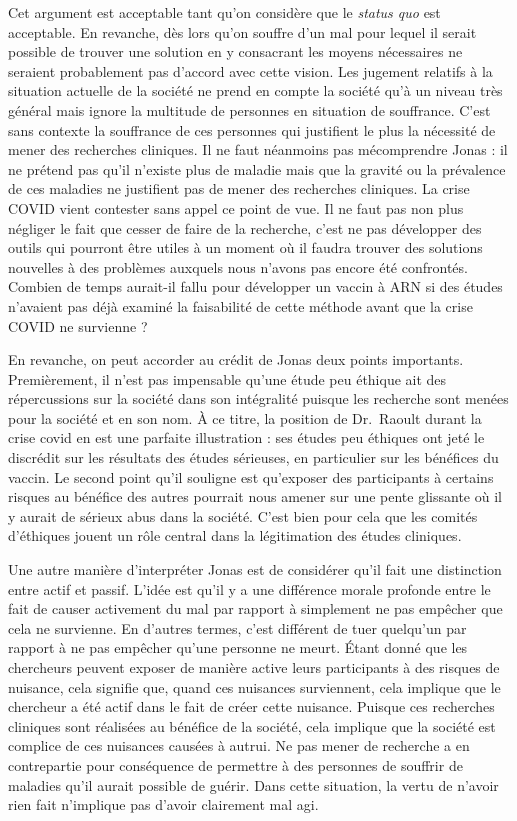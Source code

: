 \documentclass[
  12pt,
]{book}
\begin{document}
Cet argument est acceptable tant qu'on considère que le \emph{status quo} est acceptable. En revanche, dès lors qu'on souffre d'un mal pour lequel il serait possible de trouver une solution en y consacrant les moyens nécessaires ne seraient probablement pas d'accord avec cette vision. Les jugement relatifs à la situation actuelle de la société ne prend en compte la société qu'à un niveau très général mais ignore la multitude de personnes en situation de souffrance. C'est sans contexte la souffrance de ces personnes qui justifient le plus la nécessité de mener des recherches cliniques. Il ne faut néanmoins pas mécomprendre Jonas : il ne prétend pas qu'il n'existe plus de maladie mais que la gravité ou la prévalence de ces maladies ne justifient pas de mener des recherches cliniques. La crise COVID vient contester sans appel ce point de vue. Il ne faut pas non plus négliger le fait que cesser de faire de la recherche, c'est ne pas développer des outils qui pourront être utiles à un moment où il faudra trouver des solutions nouvelles à des problèmes auxquels nous n'avons pas encore été confrontés. Combien de temps aurait-il fallu pour développer un vaccin à ARN si des études n'avaient pas déjà examiné la faisabilité de cette méthode avant que la crise COVID ne survienne ?

En revanche, on peut accorder au crédit de Jonas deux points importants. Premièrement, il n'est pas impensable qu'une étude peu éthique ait des répercussions sur la société dans son intégralité puisque les recherche sont menées pour la société et en son nom. À ce titre, la position de Dr.~Raoult durant la crise covid en est une parfaite illustration : ses études peu éthiques ont jeté le discrédit sur les résultats des études sérieuses, en particulier sur les bénéfices du vaccin. Le second point qu'il souligne est qu'exposer des participants à certains risques au bénéfice des autres pourrait nous amener sur une pente glissante où il y aurait de sérieux abus dans la société. C'est bien pour cela que les comités d'éthiques jouent un rôle central dans la légitimation des études cliniques.

Une autre manière d'interpréter Jonas est de considérer qu'il fait une distinction entre actif et passif. L'idée est qu'il y a une différence morale profonde entre le fait de causer activement du mal par rapport à simplement ne pas empêcher que cela ne survienne. En d'autres termes, c'est différent de tuer quelqu'un par rapport à ne pas empêcher qu'une personne ne meurt. Étant donné que les chercheurs peuvent exposer de manière active leurs participants à des risques de nuisance, cela signifie que, quand ces nuisances surviennent, cela implique que le chercheur a été actif dans le fait de créer cette nuisance. Puisque ces recherches cliniques sont réalisées au bénéfice de la société, cela implique que la société est complice de ces nuisances causées à autrui. Ne pas mener de recherche a en contrepartie pour conséquence de permettre à des personnes de souffrir de maladies qu'il aurait possible de guérir. Dans cette situation, la vertu de n'avoir rien fait n'implique pas d'avoir clairement mal agi.
\end{document}
